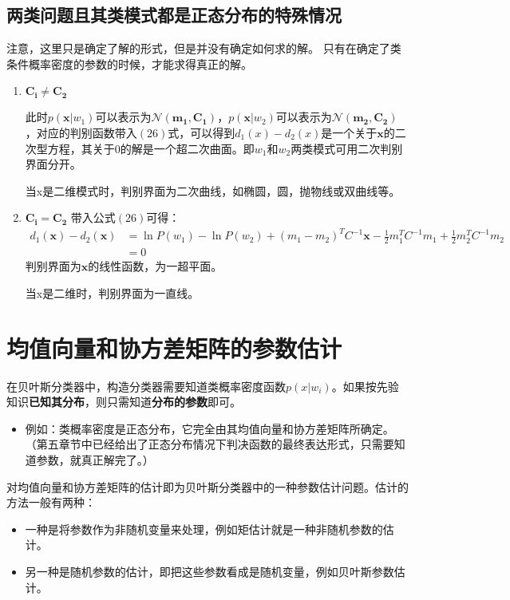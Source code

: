 \documentclass[12pt, letterpaper]{article}
\begin{document}
\subsection{两类问题且其类模式都是正态分布的特殊情况}
注意，这里只是确定了解的形式，但是并没有确定如何求的解。
只有在确定了类条件概率密度的参数的时候，才能求得真正的解。
\begin{enumerate}
\item $\mathbf{C_i}\neq \mathbf{C_2}$

\qquad 此时$p(\mathbf{x}|w_1)$可以表示为$\mathscr{N}(\mathbf{m_1}, \mathbf{C_1})$，$p(\mathbf{x}|w_2)$可以表示为$\mathscr{N}(\mathbf{m_2}, \mathbf{C_2})$，对应的判别函数带入$(26)$式，可以得到$d_1(x)-d_2(x)$是一个关于$\mathbf{x}$的二次型方程，其关于$0$的解是一个超二次曲面。即$w_1$和$w_2$两类模式可用二次判别界面分开。

\qquad 当x是二维模式时，判别界面为二次曲线，如椭圆，圆，抛物线或双曲线等。

\item $\mathbf{C_i}= \mathbf{C_2}$
带入公式$(26)$可得：
\begin{equation}
\begin{aligned}
d_1(\mathbf{x})-d_2(\mathbf{x})&=\ln P(w_1)-\ln P(w_2)+(m_1-m_2)^TC^{-1}\mathbf{x}-\frac{1}{2}m_1^TC^{-1}m_1+\frac{1}{2}m_2^TC^{-1}m_2\\
&=0
\end{aligned}
\end{equation}
\qquad 判别界面为$\mathbf{x}$的线性函数，为一超平面。

\qquad 当x是二维时，判别界面为一直线。
\end{enumerate}

\section{均值向量和协方差矩阵的参数估计}
在贝叶斯分类器中，构造分类器需要知道类概率密度函数$p(x|w_i)$。如果按先验知识\textbf{已知其分布}，则只需知道\textbf{分布的参数}即可。
\begin{itemize}
\item 例如：类概率密度是正态分布，它完全由其均值向量和协方差矩阵所确定。（第五章节中已经给出了正态分布情况下判决函数的最终表达形式，只需要知道参数，就真正解完了。）
\end{itemize}

对均值向量和协方差矩阵的估计即为贝叶斯分类器中的一种参数估计问题。估计的方法一般有两种：
\begin{itemize}
\item 一种是将参数作为非随机变量来处理，例如矩估计就是一种非随机参数的估计。
\item 另一种是随机参数的估计，即把这些参数看成是随机变量，例如贝叶斯参数估计。
\end{itemize}
\end{document}
